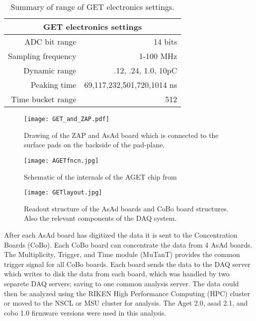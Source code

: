 \begin{table*}[!htb]
\centering
{}
\begin{tabular}{@{}rr@{}}\toprule 
\multicolumn{2}{c}{GET electronics settings}\\
\midrule
ADC bit range       & 14 bits \\
Sampling frequency  & 1-100 MHz \\
Dynamic range       & .12, .24, 1.0, 10pC \\
Peaking time        & 69,117,232,501,720,1014 ns \\
Time bucket range   & 512\\
\bottomrule
\end{tabular}
\caption{Summary of range of GET electronics settings. }
\label{tb:getoverview}
\end{table*}

\begin{figure}[!htb]
\centering
\texttt{[image: GET\_and\_ZAP.pdf]}
\caption{Drawing of the ZAP and AsAd board which is connected to the surface pads on the backside of the pad-plane.}
\label{fig:getzap}
\end{figure}



\begin{figure}[!htb]
\centering
\texttt{[image: AGETfncn.jpg]}
\caption{Schematic of the internals of the AGET chip from \cite{get2}}
\label{fig:aget}
\end{figure}


\begin{figure}[!htb]
\centering
\texttt{[image: GETlayout.jpg]}
\caption{Readout structure of the AsAd boards and CoBo board structures. Also the relevant components of the DAQ system.}
\label{fig:coboDAQ}
\end{figure}

After each AsAd board has digitized the data it is sent to the Concentration Boards (CoBo). Each CoBo board can concentrate the data from 4 AsAd boards. The Multiplicity, Trigger, and Time module (MuTanT) \cite{get} provides the common trigger signal for all CoBo boards.  Each board sends the data to the DAQ server which writes to disk the data from each board, which was handled by two separete DAQ servers; saving to one common analysis server. The data could then be analyzed using the RIKEN High Performance Computing (HPC) cluster or moved to the NSCL or MSU cluster for analysis. The Aget 2.0, asad 2.1, and cobo 1.0 firmware versions were used in this analysis. 

